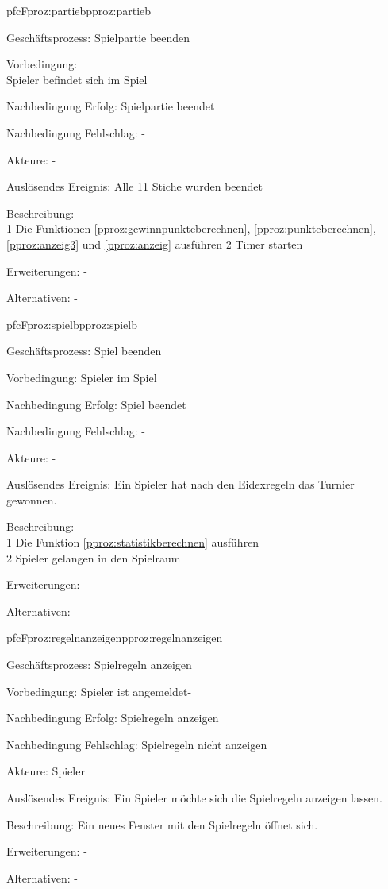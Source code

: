 \begin{description}[leftmargin=3em, style=sameline]
	\begin{php}{pfc}{F}{proz:partieb}{pproz:partieb}
		\item [Geschäftsprozess:] Spielpartie beenden
		\item [Vorbedingung:]\hfill\\
		Spieler befindet sich im Spiel
		\item [Nachbedingung Erfolg:] Spielpartie beendet
		\item [Nachbedingung Fehlschlag:] -
		\item [Akteure:] -
		\item [Auslösendes Ereignis:] Alle 11 Stiche wurden beendet
		\item [Beschreibung:] \hfill\\
		1 Die Funktionen \ref{pproz:gewinnpunkteberechnen}, \ref{pproz:punkteberechnen},\ref{pproz:anzeig3} und \ref{pproz:anzeig} ausführen
		2 Timer starten
		\item [Erweiterungen:] -
		\item [Alternativen:] -
	\end{php}
	
	\begin{php}{pfc}{F}{proz:spielb}{pproz:spielb}
		\item [Geschäftsprozess:] Spiel beenden
		\item [Vorbedingung:]
		Spieler im Spiel
		\item [Nachbedingung Erfolg:] Spiel beendet
		\item [Nachbedingung Fehlschlag:] -
		\item [Akteure:] -
		\item [Auslösendes Ereignis:] Ein Spieler hat nach den  Eidexregeln das Turnier gewonnen.
		\item [Beschreibung:]\hfill\\
		1 Die Funktion \ref{pproz:statistikberechnen} ausführen \\
		2 Spieler gelangen in den Spielraum
		\item [Erweiterungen:] -
		\item [Alternativen:] -
	\end{php}
	
	\begin{php}{pfc}{F}{proz:regelnanzeigen}{pproz:regelnanzeigen}
		\item [Geschäftsprozess:] Spielregeln anzeigen
		\item [Vorbedingung:] Spieler ist angemeldet-
		\item [Nachbedingung Erfolg:] Spielregeln anzeigen
		\item [Nachbedingung Fehlschlag:] Spielregeln nicht anzeigen
		\item [Akteure:] Spieler
		\item [Auslösendes Ereignis:] Ein Spieler möchte sich die Spielregeln anzeigen lassen.
		\item [Beschreibung:] Ein neues Fenster mit den Spielregeln öffnet sich.
		\item [Erweiterungen:] -
		\item [Alternativen:] -
	\end{php}
	
	
\end{description}